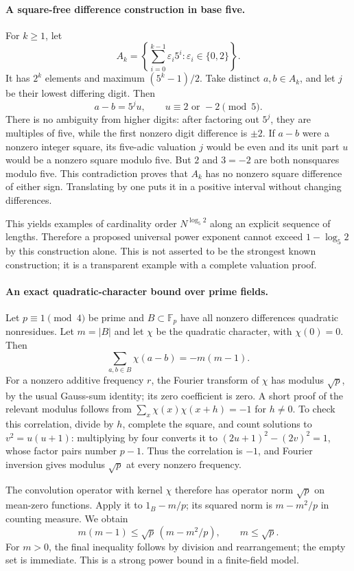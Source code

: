\documentclass[11pt,a4paper]{article}
\newcommand{\F}{\mathbb{F}}
\begin{document}
\paragraph{A square-free difference construction in base five.}
For $k\geq1$, let
\[
 A_k=\left\{\sum_{i=0}^{k-1}\varepsilon_i5^i:\varepsilon_i\in\{0,2\}\right\}.
\]
It has $2^k$ elements and maximum $(5^k-1)/2$. Take distinct $a,b\in A_k$, and let $j$ be their lowest differing digit. Then
\[
 a-b=5^j u,\qquad u\equiv2\text{ or }-2\pmod5.
\]
There is no ambiguity from higher digits: after factoring out $5^j$, they are multiples of five, while the first nonzero digit difference is $\pm2$. If $a-b$ were a nonzero integer square, its five-adic valuation $j$ would be even and its unit part $u$ would be a nonzero square modulo five. But $2$ and $3=-2$ are both nonsquares modulo five. This contradiction proves that $A_k$ has no nonzero square difference of either sign. Translating by one puts it in a positive interval without changing differences.

This yields examples of cardinality order $N^{\log_5 2}$ along an explicit sequence of lengths. Therefore a proposed universal power exponent cannot exceed $1-\log_5 2$ by this construction alone. This is not asserted to be the strongest known construction; it is a transparent example with a complete valuation proof.

\paragraph{An exact quadratic-character bound over prime fields.}
Let $p\equiv1\pmod4$ be prime and $B\subset\F_p$ have all nonzero differences quadratic nonresidues. Let $m=|B|$ and let $\chi$ be the quadratic character, with $\chi(0)=0$. Then
\[
 \sum_{a,b\in B}\chi(a-b)=-m(m-1).
\]
For a nonzero additive frequency $r$, the Fourier transform of $\chi$ has modulus $\sqrt p$, by the usual Gauss-sum identity; its zero coefficient is zero. A short proof of the relevant modulus follows from $\sum_x\chi(x)\chi(x+h)=-1$ for $h\ne0$. To check this correlation, divide by $h$, complete the square, and count solutions to $v^2=u(u+1)$: multiplying by four converts it to $(2u+1)^2-(2v)^2=1$, whose factor pairs number $p-1$. Thus the correlation is $-1$, and Fourier inversion gives modulus $\sqrt p$ at every nonzero frequency.

The convolution operator with kernel $\chi$ therefore has operator norm $\sqrt p$ on mean-zero functions. Apply it to $1_B-m/p$; its squared norm is $m-m^2/p$ in counting measure. We obtain
\[
 m(m-1)\leq\sqrt p\,(m-m^2/p),
 \qquad m\leq\sqrt p.
\]
For $m>0$, the final inequality follows by division and rearrangement; the empty set is immediate. This is a strong power bound in a finite-field model.
\end{document}
